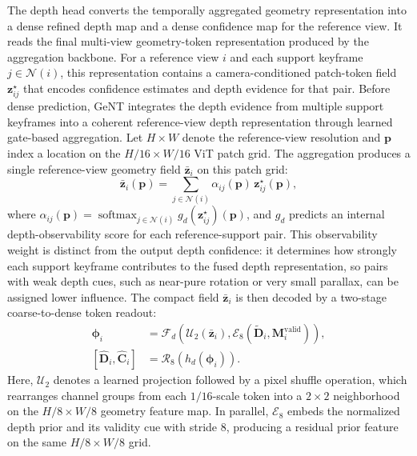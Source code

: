 The depth head converts the temporally aggregated geometry representation into a dense refined depth map and a dense confidence map for the reference view.
It reads the final multi-view geometry-token representation produced by the aggregation backbone.
For a reference view $i$ and each support keyframe $j\in\mathcal{N}(i)$, this representation contains a camera-conditioned patch-token field $\bm{z}_{ij}^{\star}$ that encodes confidence estimates and depth evidence for that pair.
Before dense prediction, GeNT integrates the depth evidence from multiple support keyframes into a coherent reference-view depth representation through learned gate-based aggregation.
Let $H\times W$ denote the reference-view resolution and $\bm{p}$ index a location on the $H/16\times W/16$ ViT patch grid.
The aggregation produces a single reference-view geometry field $\bar{\bm{z}}_i$ on this patch grid:
\begin{equation}
    \bar{\bm{z}}_i(\bm{p})
    =
    \sum_{j\in\mathcal{N}(i)}
    \alpha_{ij}(\bm{p})\,\bm{z}_{ij}^{\star}(\bm{p}),
\label{eq:geont_depth_view_aggregation}
\end{equation}
where $\alpha_{ij}(\bm{p})=\operatorname{softmax}_{j\in\mathcal{N}(i)} g_d(\bm{z}_{ij}^{\star})(\bm{p})$, and $g_d$ predicts an internal depth-observability score for each reference-support pair.
This observability weight is distinct from the output depth confidence: it determines how strongly each support keyframe contributes to the fused depth representation, so pairs with weak depth cues, such as near-pure rotation or very small parallax, can be assigned lower influence.
The compact field $\bar{\bm{z}}_i$ is then decoded by a two-stage coarse-to-dense token readout:
\begin{equation}
\begin{aligned}
    \bm{\phi}_i
    &=
    \mathcal{F}_d\!\left(
        \mathcal{U}_2(\bar{\bm{z}}_i),
        \mathcal{E}_8(\tilde{\bm{D}}_i,\bm{M}_i^{\mathrm{valid}})
    \right),\\
    [\hat{\bm{D}}_i,\hat{\bm{C}}_i]
    &=
    \mathcal{R}_8\!\left(h_d(\bm{\phi}_i)\right).
\end{aligned}
    \label{eq:geont_depth_dense_readout}
\end{equation}
Here, $\mathcal{U}_2$ denotes a learned projection followed by a pixel shuffle operation, which rearranges channel groups from each $1/16$-scale token into a $2\times2$ neighborhood on the $H/8\times W/8$ geometry feature map.
In parallel, $\mathcal{E}_8$ embeds the normalized depth prior and its validity cue with stride $8$, producing a residual prior feature on the same $H/8\times W/8$ grid.
